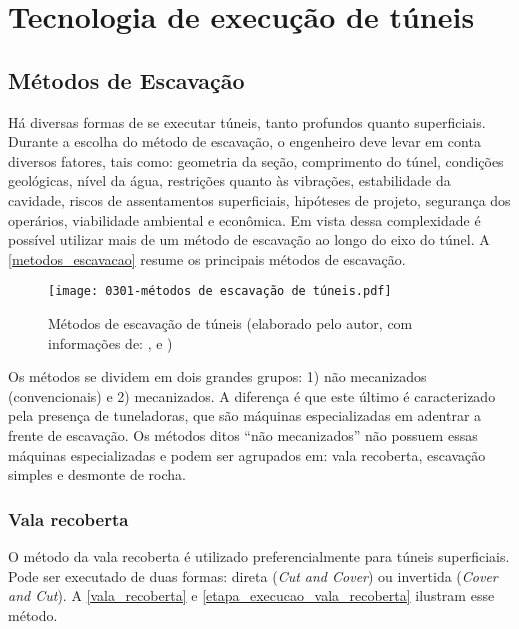 \chapter{Tecnologia de execução de túneis}

\section{Métodos de Escavação}

Há diversas formas de se executar túneis, tanto profundos quanto superficiais. Durante a escolha do método de escavação, o engenheiro deve levar em conta diversos fatores, tais como: geometria da seção, comprimento do túnel, condições geológicas, nível da água, restrições quanto às vibrações, estabilidade da cavidade, riscos de assentamentos superficiais, hipóteses de projeto, segurança dos operários, viabilidade ambiental e econômica. Em vista dessa complexidade é possível utilizar mais de um método de escavação ao longo do eixo do túnel. A \autoref{metodos_escavacao} resume os principais métodos de escavação.

\begin{figure}[H]
	\begin{center}
		\texttt{[image: 0301-métodos de escavação de túneis.pdf]}
	\end{center}
	\caption{\label{metodos_escavacao}Métodos de escavação de túneis (elaborado pelo autor, com informações de: ,  e )}
\end{figure}

Os métodos se dividem em dois grandes grupos: 1) não mecanizados (convencionais) e 2) mecanizados. A diferença é que este último é caracterizado pela presença de tuneladoras, que são máquinas especializadas em adentrar a frente de escavação. Os métodos ditos “não mecanizados” não possuem essas máquinas especializadas e podem ser agrupados em: vala recoberta, escavação simples e desmonte de rocha.

\subsection{Vala recoberta}

O método da vala recoberta é utilizado preferencialmente para túneis superficiais. Pode ser executado de duas formas: direta (\textit{Cut and Cover}) ou invertida (\textit{Cover and Cut}). A \autoref{vala_recoberta} e \autoref{etapa_execucao_vala_recoberta} ilustram esse método.

